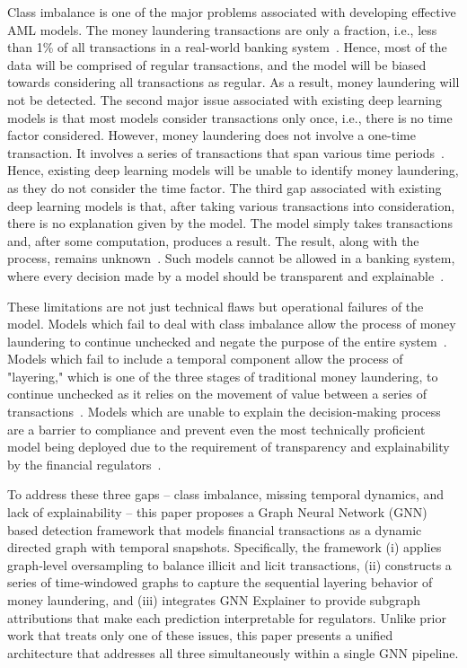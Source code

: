 \documentclass[conference]{IEEEtran}
\begin{document}
Class imbalance is one of the major problems associated with developing effective AML models. The money laundering transactions are only a fraction, i.e., less than 1\% of all transactions in a real-world banking system~\cite{hilal2022}. Hence, most of the data will be comprised of regular transactions, and the model will be biased towards considering all transactions as regular. As a result, money laundering will not be detected. The second major issue associated with existing deep learning models is that most models consider transactions only once, i.e., there is no time factor considered. However, money laundering does not involve a one-time transaction. It involves a series of transactions that span various time periods~\cite{alarab2022}. Hence, existing deep learning models will be unable to identify money laundering, as they do not consider the time factor. The third gap associated with existing deep learning models is that, after taking various transactions into consideration, there is no explanation given by the model. The model simply takes transactions and, after some computation, produces a result. The result, along with the process, remains unknown~\cite{kute2021}. Such models cannot be allowed in a banking system, where every decision made by a model should be transparent and explainable~\cite{kurshan2021}.

These limitations are not just technical flaws but operational failures of the model. Models which fail to deal with class imbalance allow the process of money laundering to continue unchecked and negate the purpose of the entire system~\cite{egressy2024, vassallo2021}. Models which fail to include a temporal component allow the process of "layering," which is one of the three stages of traditional money laundering, to continue unchecked as it relies on the movement of value between a series of transactions~\cite{pareja2020, wan2024}. Models which are unable to explain the decision-making process are a barrier to compliance and prevent even the most technically proficient model being deployed due to the requirement of transparency and explainability by the financial regulators~\cite{kute2021, canhoto2021}.

To address these three gaps – class imbalance, missing temporal dynamics, and lack of explainability – this paper proposes a Graph Neural Network (GNN) based detection framework that models financial transactions as a dynamic directed graph with temporal snapshots. Specifically, the framework (i) applies graph‑level oversampling to balance illicit and licit transactions, (ii) constructs a series of time‑windowed graphs to capture the sequential layering behavior of money laundering, and (iii) integrates GNN Explainer to provide subgraph attributions that make each prediction interpretable for regulators. Unlike prior work that treats only one of these issues, this paper presents a unified architecture that addresses all three simultaneously within a single GNN pipeline.
\end{document}
